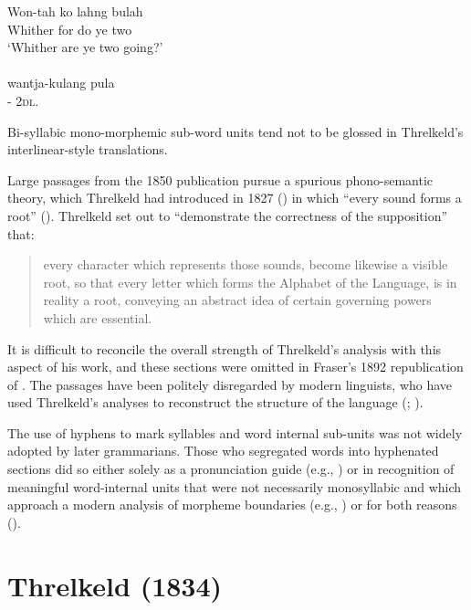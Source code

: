 \ea\label{ex:3:3-18}
\gll Won-tah ko lahng bulah \\
Whither for do ye two \\
\glt `Whither are ye two going?' \\
\citep[8]{threlkeld_specimens_1927} \\
\gll wantja-kulang pula \\
- 2\textsc{dl}.  \\
\glt 
\z

Bi-syllabic mono-morphemic sub-word units tend not to be glossed in Threlkeld’s interlinear-style translations.

Large passages from the 1850 publication \citep[19--30, 38--43]{threlkeld_key_1850} pursue a spurious phono-semantic theory, which Threlkeld had introduced in 1827 (\citealt[1--3]{threlkeld_specimens_1927}) in which “every sound forms a root” (\citeyear[90]{threlkeld_key_1850}). Threlkeld set out to “demonstrate the correctness of the supposition” that: 

\begin{quote}
    every character which represents those sounds, become likewise a visible root, so that every letter which forms the Alphabet of the Language, is in reality a root, conveying an abstract idea of certain governing powers which are essential. \citep[9]{threlkeld_key_1850}
\end{quote}

It is difficult to reconcile the overall strength of Threlkeld’s analysis with this aspect of his work, and these sections were omitted in Fraser’s 1892 republication of \citet{threlkeld_key_1850}. The passages have been politely disregarded by modern linguists, who have used Threlkeld’s analyses to reconstruct the structure of the language (\citealt[46]{oppliger_phonology_1984}; \citealt{lissarrague_salvage_2006}).

The use of hyphens to mark syllables and word internal sub-units was not widely adopted by later grammarians. Those who segregated words into hyphenated sections did so either solely as a pronunciation guide (e.g., \citealt{symmons_grammatical_1841}) or in recognition of meaningful word-internal units that were not necessarily monosyllabic and which approach a modern analysis of morpheme boundaries (e.g., \citealt{meyer_vocabulary_1843}) or for both reasons (\citealt{roth_ethnological_1897}). 

\section{Threlkeld (1834)}
\label{sec:key:3.3}

